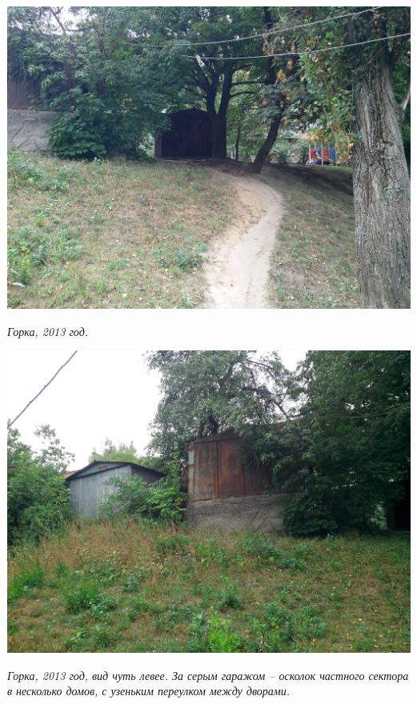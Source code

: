 \begin{center}
\includegraphics[width=\linewidth]{rpix/IMG_20130826_143424.jpg}

\textit{Горка, 2013 год.}
\end{center}


\newpage
\vspace*{\fill}
\begin{center}
\includegraphics[width=\linewidth]{rpix/IMG_20130826_143421.jpg}

\textit{Горка, 2013 год, вид чуть левее. За серым гаражом – осколок частного сектора в несколько домов, с узеньким переулком между дворами.}
\end{center}
\vspace*{\fill}

